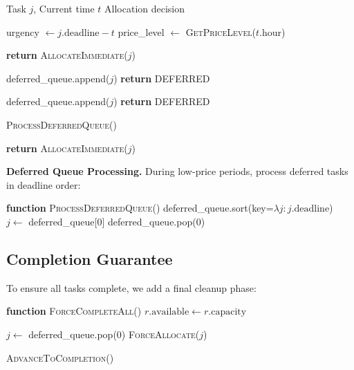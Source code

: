 \documentclass[10pt,conference]{IEEEtran}
\begin{document}
\begin{algorithm}[t]
\caption{Time-Arbitrage Scheduler}
\label{alg:scheduler}
\begin{algorithmic}[1]
\REQUIRE Task $j$, Current time $t$
\ENSURE Allocation decision

\STATE urgency $\gets j.\text{deadline} - t$
\STATE price\_level $\gets$ \textsc{GetPriceLevel}($t.\text{hour}$)

\STATE {}
    \STATE \textbf{return} \textsc{AllocateImmediate}($j$)
\ENDIF

\STATE {}
    \STATE deferred\_queue.append($j$)
    \STATE \textbf{return} DEFERRED
\ENDIF

\STATE {}
    \STATE deferred\_queue.append($j$)
    \STATE \textbf{return} DEFERRED
\ENDIF

\STATE {}
    \STATE \textsc{ProcessDeferredQueue}()
\ENDIF

\STATE {}
\STATE \textbf{return} \textsc{AllocateImmediate}($j$)
\end{algorithmic}
\end{algorithm}

\textbf{Deferred Queue Processing.} During low-price periods, process deferred tasks in deadline order:
\begin{algorithmic}[1]
\STATE \textbf{function} \textsc{ProcessDeferredQueue}()
\STATE deferred\_queue.sort(key=$\lambda j: j.\text{deadline}$)
    \STATE $j \gets$ deferred\_queue[0]
        \STATE deferred\_queue.pop(0)
    \ENDIF
\ENDWHILE
\end{algorithmic}

\subsection{Completion Guarantee}

To ensure all tasks complete, we add a final cleanup phase:
\begin{algorithmic}[1]
\STATE \textbf{function} \textsc{ForceCompleteAll}()
\STATE {}
    \STATE $r.\text{available} \gets r.\text{capacity}$
\ENDFOR

\STATE {}
    \STATE $j \gets$ deferred\_queue.pop(0)
    \STATE \textsc{ForceAllocate}($j$)
\ENDWHILE

\STATE {}
\STATE \textsc{AdvanceToCompletion}()
\end{algorithmic}
\end{document}
